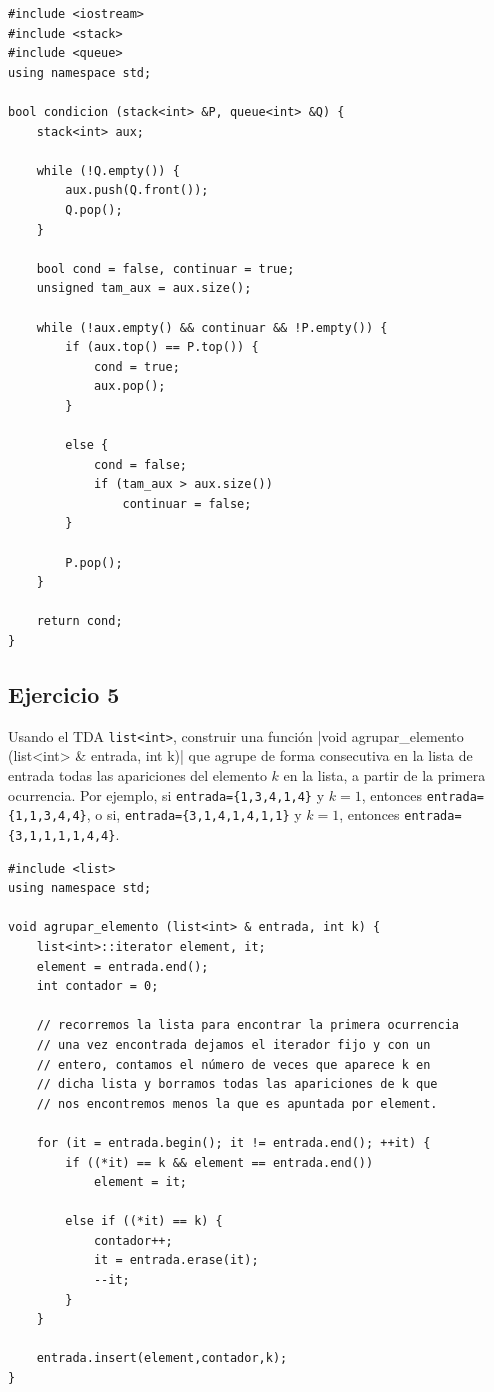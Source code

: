 \documentclass[10pt,a4paper,spanish]{report}
\begin{document}
\begin{verbatim}
#include <iostream>
#include <stack>
#include <queue>
using namespace std;

bool condicion (stack<int> &P, queue<int> &Q) {
    stack<int> aux;

    while (!Q.empty()) {
        aux.push(Q.front());
        Q.pop();
    }

    bool cond = false, continuar = true;
    unsigned tam_aux = aux.size();

    while (!aux.empty() && continuar && !P.empty()) {
        if (aux.top() == P.top()) {
            cond = true;
            aux.pop();
        }

        else {
            cond = false;
            if (tam_aux > aux.size())
                continuar = false;
        }

        P.pop();
    }

    return cond;
}
\end{verbatim}

\subsection{\textcolor[rgb]{0.5,0.8,1}Ejercicio 5}
\noindent
Usando el TDA \verb*|list<int>|, construir una función |void agrupar_elemento (list<int> & entrada, int k)| que agrupe de forma consecutiva en la lista de entrada todas las apariciones del elemento $k$ en la lista, a partir de la primera ocurrencia. Por ejemplo, si \verb*|entrada={1,3,4,1,4}| y $k=1$, entonces \verb*|entrada={1,1,3,4,4}|, o si, \verb*|entrada={3,1,4,1,4,1,1}| y $k=1$, entonces \verb*|entrada={3,1,1,1,1,4,4}|.

\begin{verbatim}
#include <list>
using namespace std;

void agrupar_elemento (list<int> & entrada, int k) {
    list<int>::iterator element, it;
    element = entrada.end();
    int contador = 0;

    // recorremos la lista para encontrar la primera ocurrencia
    // una vez encontrada dejamos el iterador fijo y con un
    // entero, contamos el número de veces que aparece k en 
    // dicha lista y borramos todas las apariciones de k que
    // nos encontremos menos la que es apuntada por element.

    for (it = entrada.begin(); it != entrada.end(); ++it) {
        if ((*it) == k && element == entrada.end())
            element = it;

        else if ((*it) == k) {
            contador++;
            it = entrada.erase(it);
            --it;
        }
    }

    entrada.insert(element,contador,k);
}
\end{verbatim}
\end{document}
